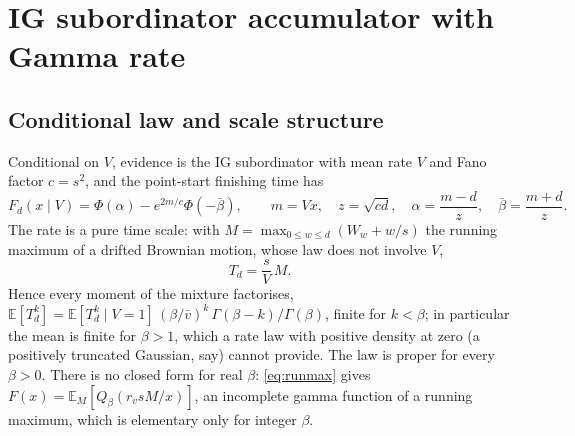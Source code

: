\documentclass[11pt]{article}
\newcommand{\E}{\mathbb{E}}
\begin{document}
\section{IG subordinator accumulator with Gamma rate}

\subsection{Conditional law and scale structure}
Conditional on $V$, evidence is the IG subordinator with mean rate $V$ and Fano factor $c=s^2$, and the point-start finishing time has
\begin{equation}
F_d(x\mid V)=\Phi(\alpha)-e^{2m/c}\Phi(-\bar\beta),\qquad m=Vx,\quad z=\sqrt{cd},\quad \alpha=\frac{m-d}{z},\quad \bar\beta=\frac{m+d}{z}.
\label{eq:igF}
\end{equation}
The rate is a pure time scale: with $M=\max_{0\le w\le d}(W_w+w/s)$ the running maximum of a drifted Brownian motion, whose law does not involve $V$,
\begin{equation}
T_d=\frac{s}{V}\,M .
\label{eq:runmax}
\end{equation}
Hence every moment of the mixture factorises, $\E[T_d^k]=\E[T_d^k\mid V=1]\,(\beta/\bar v)^k\,\Gamma(\beta-k)/\Gamma(\beta)$, finite for $k<\beta$; in particular the mean is finite for $\beta>1$, which a rate law with positive density at zero (a positively truncated Gaussian, say) cannot provide. The law is proper for every $\beta>0$. There is no closed form for real $\beta$: \eqref{eq:runmax} gives $F(x)=\E_M[Q_\beta(r_v sM/x)]$, an incomplete gamma function of a running maximum, which is elementary only for integer $\beta$.
\end{document}
